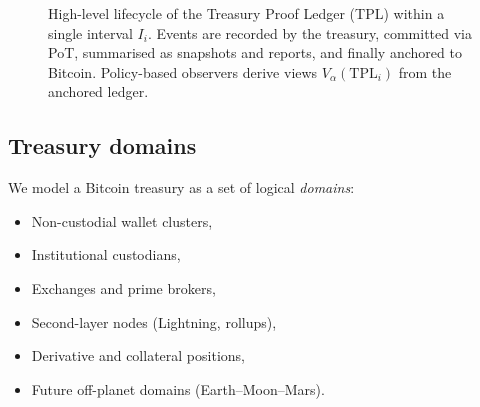 \documentclass[11pt]{article}
\begin{document}
\begin{figure}[t]
  \centering
  \caption{High-level lifecycle of the Treasury Proof Ledger (TPL) within a single interval $I_i$.
  Events are recorded by the treasury, committed via PoT, summarised as snapshots and reports,
  and finally anchored to Bitcoin. Policy-based observers derive views $V_\alpha(\mathrm{TPL}_i)$
  from the anchored ledger.}
  \label{fig:tpl-lifecycle}
\end{figure}
\label{sec:model}

\subsection{Treasury domains}

We model a Bitcoin treasury as a set of logical \emph{domains}:

\begin{itemize}[noitemsep]
\item Non-custodial wallet clusters,
\item Institutional custodians,
\item Exchanges and prime brokers,
\item Second-layer nodes (Lightning, rollups),
\item Derivative and collateral positions,
\item Future off-planet domains (Earth--Moon--Mars).
\end{itemize}
\end{document}
